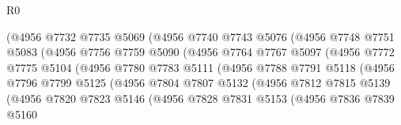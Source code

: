 \begin{lexlean}{R0}
\begin{coremodule}
                          (@4956
                            @7732
                            @7735
                            @5069
                            (@4956
                              @7740
                              @7743
                              @5076
                              (@4956
                                @7748
                                @7751
                                @5083
                                (@4956
                                  @7756
                                  @7759
                                  @5090
                                  (@4956
                                    @7764
                                    @7767
                                    @5097
                                    (@4956
                                      @7772
                                      @7775
                                      @5104
                                      (@4956
                                        @7780
                                        @7783
                                        @5111
                                        (@4956
                                          @7788
                                          @7791
                                          @5118
                                          (@4956
                                            @7796
                                            @7799
                                            @5125
                                            (@4956
                                              @7804
                                              @7807
                                              @5132
                                              (@4956
                                                @7812
                                                @7815
                                                @5139
                                                (@4956
                                                  @7820
                                                  @7823
                                                  @5146
                                                  (@4956
                                                    @7828
                                                    @7831
                                                    @5153
                                                    (@4956
                                                      @7836
                                                      @7839
                                                      @5160

\end{coremodule}
\end{lexlean}
